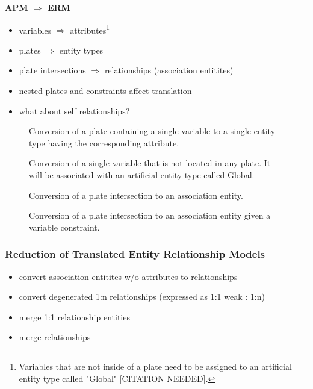 \textbf{APM $\Rightarrow$ ERM}
\begin{itemize}
\item variables $\Rightarrow$ attributes\footnote{Variables that are not inside of a plate need to be assigned to an artificial entity type called "Global" [CITATION NEEDED].}
\item plates $\Rightarrow$ entity types
\item plate intersections $\Rightarrow$ relationships (association entitites)
\item nested plates and constraints affect translation
\item what about self relationships?
\end{itemize}

\begin{figure}
\centering
\scalebox{\tikzScale}{\adjustTikzSize }
\caption{Conversion of a plate containing a single variable to a single entity type having the corresponding attribute.}\label{fig:pm2erm_uno_local}
\end{figure}

\begin{figure}
\centering
\scalebox{\tikzScale}{\adjustTikzSize }
\caption{Conversion of a single variable that is not located in any plate. It will be associated with an artificial entity type called Global.}\label{fig:pm2erm_uno_global}
\end{figure}

\begin{figure}
\centering
\scalebox{\tikzScale}{\adjustTikzSize }
\caption{Conversion of a plate intersection to an association entity.}\label{fig:pm2erm_bi_noconstraints}
\end{figure}

\begin{figure}
\centering
\scalebox{\tikzScale}{\adjustTikzSize }
\caption{Conversion of a plate intersection to an association entity given a variable constraint.}\label{fig:pm2erm_bi_constraints}
\end{figure}

\subsubsection{Reduction of Translated Entity Relationship Models}

\begin{itemize}
\item convert association entitites w/o attributes to relationships
\item convert degenerated 1:n relationships (expressed as 1:1 weak : 1:n)
\item merge 1:1 relationship entities
\item merge relationships
\end{itemize}

